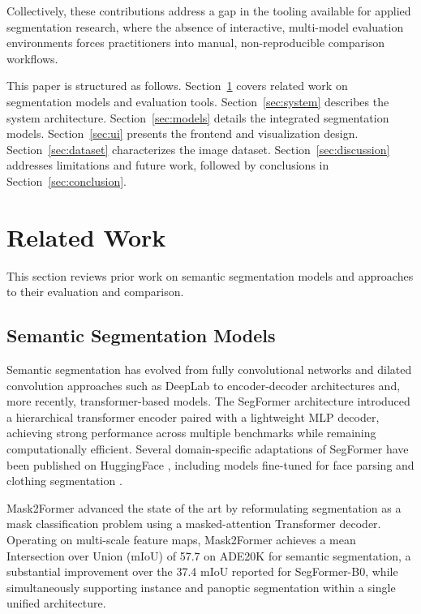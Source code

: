 \documentclass[conference,a4paper,flushend]{iaria}
\begin{document}
Collectively, these contributions address a gap in the tooling available for applied segmentation research, where the absence of interactive, multi-model evaluation environments forces practitioners into manual, non-reproducible comparison workflows.

This paper is structured as follows. Section~\ref{sec:related} covers related work on segmentation models and evaluation tools. Section~\ref{sec:system} describes the system architecture. Section~\ref{sec:models} details the integrated segmentation models. Section~\ref{sec:ui} presents the frontend and visualization design. Section~\ref{sec:dataset} characterizes the image dataset. Section~\ref{sec:discussion} addresses limitations and future work, followed by conclusions in Section~\ref{sec:conclusion}.

\section{Related Work}
\label{sec:related}

This section reviews prior work on semantic segmentation models and approaches to their evaluation and comparison.

\subsection{Semantic Segmentation Models}

Semantic segmentation has evolved from fully convolutional networks \cite{long2015fullyconvolutionalnetworkssemantic} and dilated convolution approaches such as DeepLab \cite{chen2017deeplabsemanticimagesegmentation} to encoder-decoder architectures \cite{ronneberger2015unetconvolutionalnetworksbiomedical} and, more recently, transformer-based models. The SegFormer architecture \cite{xie2021segformersimpleefficientdesign} introduced a hierarchical transformer encoder paired with a lightweight MLP decoder, achieving strong performance across multiple benchmarks while remaining computationally efficient. Several domain-specific adaptations of SegFormer have been published on HuggingFace \cite{wolf2020huggingfacestransformersstateoftheartnatural}, including models fine-tuned for face parsing \cite{jonathandinu2023faceparsing} and clothing segmentation \cite{afridi2023segformerb3}.

Mask2Former \cite{cheng2022maskedattentionmasktransformeruniversal} advanced the state of the art by reformulating segmentation as a mask classification problem using a masked-attention Transformer decoder. Operating on multi-scale feature maps, Mask2Former achieves a mean Intersection over Union (mIoU) of 57.7 on ADE20K for semantic segmentation, a substantial improvement over the 37.4 mIoU reported for SegFormer-B0, while simultaneously supporting instance and panoptic segmentation within a single unified architecture.
\end{document}
